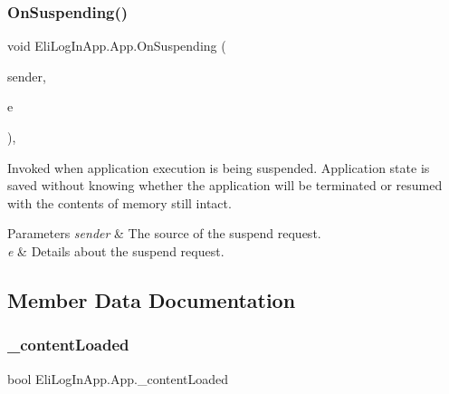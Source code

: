 \subsubsection{\texorpdfstring{On\+Suspending()}{OnSuspending()}}
{\footnotesize\ttfamily void Eli\+Log\+In\+App.\+App.\+On\+Suspending (\begin{DoxyParamCaption}\item[{object}]{sender,  }\item[{Suspending\+Event\+Args}]{e }\end{DoxyParamCaption})\hspace{0.3cm}{\ttfamily [inline]}, {\ttfamily [private]}}



Invoked when application execution is being suspended. Application state is saved without knowing whether the application will be terminated or resumed with the contents of memory still intact. 


\begin{DoxyParams}{Parameters}
{\em sender} & The source of the suspend request.\\
\hline
{\em e} & Details about the suspend request.\\
\hline
\end{DoxyParams}


\subsection{Member Data Documentation}
\mbox{\label{class_eli_log_in_app_1_1_app_a71e2bbbc7515a25fd496fcfe8147be7d}} 
\subsubsection{\texorpdfstring{\+\_\+content\+Loaded}{\_contentLoaded}}
{\footnotesize\ttfamily bool Eli\+Log\+In\+App.\+App.\+\_\+content\+Loaded\hspace{0.3cm}{\ttfamily [private]}}

\mbox{\label{class_eli_log_in_app_1_1_app_a69a630d438b0944c8b601852c659451d}} 
